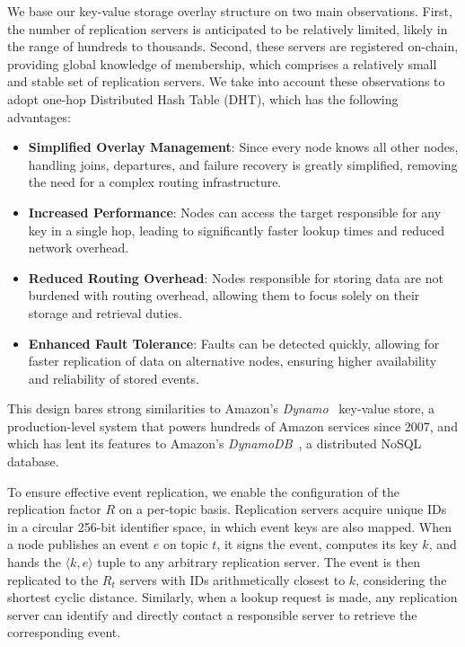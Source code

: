 We base our key-value storage overlay structure on two main observations.
First, the number of replication servers is anticipated to be relatively limited, likely in the range of hundreds to thousands.
Second, these servers are registered on-chain, providing global knowledge of membership, which comprises a relatively small and stable set of replication servers.
We take into account these observations to adopt one-hop Distributed Hash Table (DHT), which has the following advantages:
\begin{itemize}
  \item \textbf{Simplified Overlay Management}: Since every node knows all other nodes, handling joins, departures, and failure recovery is greatly simplified, removing the need for a complex routing infrastructure.
  \item \textbf{Increased Performance}: Nodes can access the target responsible for any key in a single hop, leading to significantly faster lookup times and reduced network overhead.
  \item \textbf{Reduced Routing Overhead}: Nodes responsible for storing data are not burdened with routing overhead, allowing them to focus solely on their storage and retrieval duties.
  \item \textbf{Enhanced Fault Tolerance}: Faults can be detected quickly, allowing for faster replication of data on alternative nodes, ensuring higher availability and reliability of stored events.
\end{itemize}

This design bares strong similarities to Amazon's \emph{Dynamo}~\cite{Dynamo} key-value store, a production-level system that powers hundreds of Amazon services since 2007, and which has lent its features to Amazon's \emph{DynamoDB}~\cite{DynamoDB}, a distributed NoSQL database.

To ensure effective event replication, we enable the configuration of the replication factor $R$ on a per-topic basis.
Replication servers acquire unique IDs in a circular 256-bit identifier space, in which event keys are also mapped.
When a node publishes an event $e$ on topic $t$, it signs the event, computes its key $k$, and hands the $\langle k,e \rangle$ tuple to any arbitrary replication server.
The event is then replicated to the $R_t$ servers with IDs arithmetically closest to $k$, considering the shortest cyclic distance.
Similarly, when a lookup request is made, any replication server can identify and directly contact a responsible server to retrieve the corresponding event.

